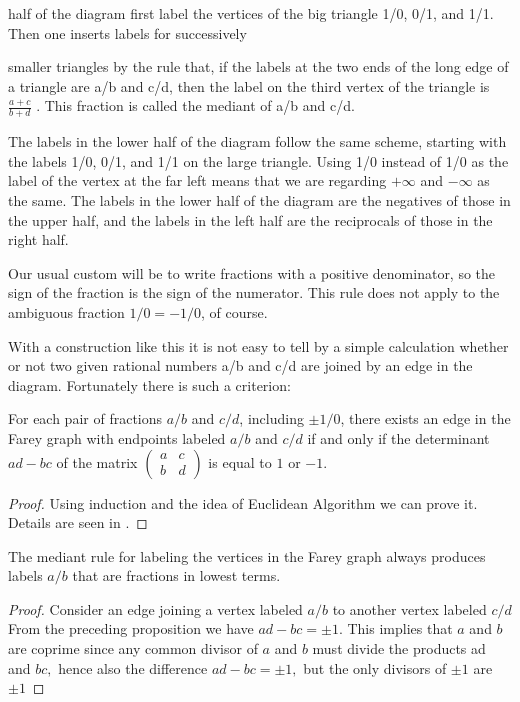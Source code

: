 half of the diagram first label the vertices of the big triangle 1/0, 0/1, and 1/1. Then one inserts labels for successively
\par
smaller triangles by the rule that, if the labels at the two ends
of the long edge of a triangle are a/b and c/d, then the label
on the third vertex of the triangle is $\frac{a+c}{b+d}$
. This fraction is called the mediant of a/b and c/d.
\par
The labels in the lower half of the diagram follow the same scheme, starting with
the labels 1/0, 0/1, and 1/1 on the large triangle. Using 1/0 instead of 1/0 as
the label of the vertex at the far left means that we are regarding $+\infty$ and $-\infty$ as the
same. The labels in the lower half of the diagram are the negatives of those in the
upper half, and the labels in the left half are the reciprocals of those in the right half.
\par
Our usual custom will be to write fractions with a positive denominator, so the
sign of the fraction is the sign of the numerator. This rule does not apply to the
ambiguous fraction $1/0 = -1/0$, of course.
\par
With a construction like this it is not easy to tell by a simple calculation whether or not two given rational numbers a/b and c/d are joined by an edge in the diagram. Fortunately there is such a criterion:
\begin{proposition}
\label{prop3.1}
For each pair of fractions $a/b$ and $c / d$, including $\pm 1 / 0$, there exists an edge in the Farey graph with endpoints labeled $a / b$ and $c / d$ if and only if the determinant $ad-bc$ of the matrix $\left(\begin{array}{ll}a&c \\ b&d\end{array}\right)$ is equal to $1$ or $-1$.
\end{proposition}
\begin{proof}
Using induction and the idea of Euclidean Algorithm we can prove it. Details are seen in \cite{hatcher2002topology}.
\end{proof}
\begin{corollary}
The mediant rule for labeling the vertices in the Farey graph always
produces labels $a / b$ that are fractions in lowest terms.
\end{corollary}
\begin{proof}
Consider an edge joining a vertex labeled $a / b$ to another vertex labeled $c / d$ From the preceding proposition we have $a d-b c=\pm 1 .$ This implies that $a$ and $b$ are coprime since any common divisor of $a$ and $b$ must divide the products ad and $b c,$ hence also the difference $a d-b c=\pm 1,$ but the only divisors of $\pm1$ are $\pm1$
\end{proof}
